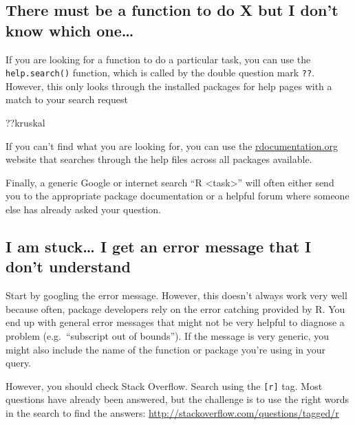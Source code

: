 \documentclass[
]{book}
\newenvironment{Shaded}{\begin{snugshade}}{\end{snugshade}}
\newcommand{\NormalTok}[1]{#1}
\begin{document}
\hypertarget{there-must-be-a-function-to-do-x-but-i-dont-know-which-one}{%
\subsection{There must be a function to do X but I don't know which one\ldots{}}\label{there-must-be-a-function-to-do-x-but-i-dont-know-which-one}}

If you are looking for a function to do a particular task, you can use the
\texttt{help.search()} function, which is called by the double question mark \texttt{??}.
However, this only looks through the installed packages for help pages with a
match to your search request

\begin{Shaded}
\begin{Highlighting}[]
\NormalTok{??kruskal}
\end{Highlighting}
\end{Shaded}

If you can't find what you are looking for, you can use
the \href{http://www.rdocumentation.org}{rdocumentation.org} website that searches
through the help files across all packages available.

Finally, a generic Google or internet search ``R \textless task\textgreater{}'' will often either send
you to the appropriate package documentation or a helpful forum where someone
else has already asked your question.

\hypertarget{i-am-stuck-i-get-an-error-message-that-i-dont-understand}{%
\subsection{I am stuck\ldots{} I get an error message that I don't understand}\label{i-am-stuck-i-get-an-error-message-that-i-dont-understand}}

Start by googling the error message. However, this doesn't always work very well
because often, package developers rely on the error catching provided by R. You
end up with general error messages that might not be very helpful to diagnose a
problem (e.g.~``subscript out of bounds''). If the message is very generic, you
might also include the name of the function or package you're using in your
query.

However, you should check Stack Overflow. Search using the \texttt{{[}r{]}} tag. Most
questions have already been answered, but the challenge is to use the right
words in the search to find the
answers:
\url{http://stackoverflow.com/questions/tagged/r}
\end{document}
